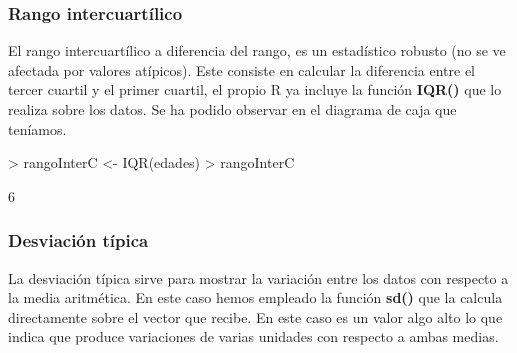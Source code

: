 \documentclass [a4paper] {article}
\begin{document}
\subsubsection{ Rango intercuartílico}
El rango intercuartílico a diferencia del rango, es un estadístico robusto (no se ve afectada por valores atípicos). Este consiste en calcular la diferencia entre el 
tercer cuartil y el primer cuartil, el propio R ya incluye la función \textbf{IQR()} que lo realiza sobre los datos. Se ha podido observar en el diagrama de caja que teníamos.

\begin{Schunk}
\begin{Sinput}
> rangoInterC <- IQR(edades)
> rangoInterC
\end{Sinput}
\begin{Soutput}
[1] 6
\end{Soutput}
\end{Schunk}

\subsubsection{ Desviación típica}
La desviación típica sirve para mostrar la variación entre los datos con respecto a la media aritmética. En este caso hemos empleado la función \textbf{sd()} que
la calcula directamente sobre el vector que recibe. En este caso es un valor algo alto lo que indica que produce variaciones de varias unidades con respecto a ambas medias.
\end{document}
